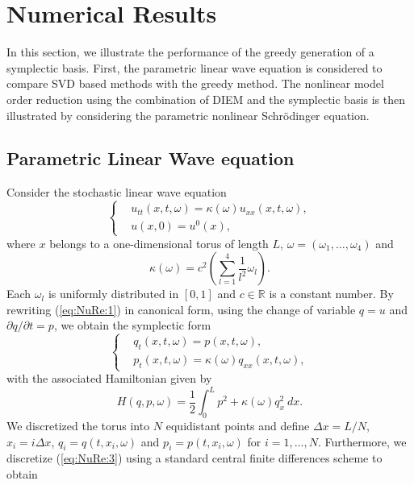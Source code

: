 \section{Numerical Results} \label{chap:NuRe:1}
In this section, we illustrate the performance of the greedy generation of a symplectic basis. First, the parametric linear wave equation is considered to compare SVD based methods with the greedy method. The nonlinear model order reduction using the combination of DIEM and the symplectic basis is then illustrated by considering the parametric nonlinear Schr\"odinger equation.

\subsection{Parametric Linear Wave equation} Consider the stochastic linear wave equation
\begin{equation} \label{eq:NuRe:1}
\left\{
\begin{aligned}
& u_{tt}(x,t,\omega) = \kappa(\omega) u_{xx}(x,t,\omega), \\
& u(x,0) = u^0(x),
\end{aligned}
\right.
\end{equation}
where $x$ belongs to a one-dimensional torus of length $L$, $\omega = (\omega_1,\dots,\omega_4)$ and
\begin{equation} \label{eq:NuRe:2}
	\kappa(\omega) = c^2\left( \sum_{l=1}^4 \frac{1}{l^2} \omega_l \right).
\end{equation}
Each $\omega_l$ is uniformly distributed in $[0,1]$ and $c\in \mathbb{R}$ is a constant number. By rewriting (\ref{eq:NuRe:1}) in canonical form, using the change of variable $q = u$ and $\partial q/ \partial t= p$, we obtain the symplectic form
\begin{equation} \label{eq:NuRe:3}
\left\{
\begin{aligned}
& q_t(x,t,\omega) = p(x,t,\omega), \\
& p_t(x,t,\omega) = \kappa(\omega) q_{xx}(x,t,\omega),
\end{aligned}
\right.
\end{equation}
with the associated Hamiltonian given by
\begin{equation} \label{eq:NuRe:4}
	H(q,p,\omega) = \frac 1 2 \int_0^L p^2 + \kappa(\omega) q_x^2 \ dx.
\end{equation}
We discretized the torus into $N$ equidistant points and define $\Delta x = L/N$, $x_i = i\Delta x$, $q_i=q(t,x_i,\omega)$ and $p_i=p(t,x_i,\omega)$ for $i = 1, \dots, N$. Furthermore, we discretize (\ref{eq:NuRe:3}) using a standard central finite differences scheme to obtain
